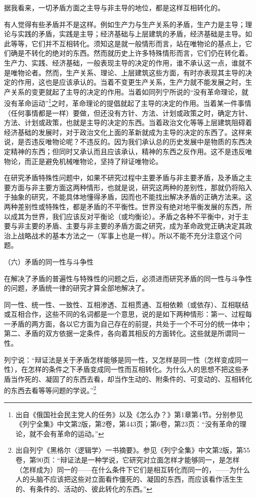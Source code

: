 \documentclass[UTF8, 12pt, a4paper]{ctexrep}
\begin{document}
据我看来，一切矛盾方面之主导与非主导的地位，都是这样互相转化的。

有人觉得有些矛盾并不是这样。例如生产力与生产关系的矛盾，生产力是主导；理论与实践的矛盾，实践是主导；经济基础与上层建筑的矛盾，经济基础是主导。如此等等，它们并不互相转化。须知这是就一般情形而言，站在唯物论的基点上，它们确是不转化的绝对的东西。然而就历史上许多特殊情形而言，它们仍在转化着。生产力、实践、经济基础，一般表现主导的决定的作用，谁不承认这一点，谁就不是唯物论者。然而，生产关系、理论、上层建筑这些方面，有时亦表现其主导的决定的作用，这也是应该承认的。当着不变更生产关系，生产力就不能发展之时，生产关系的变更就起了主导的决定的作用。当着如同列宁所说的“没有革命理论，就没有革命运动”\footnote{出自《俄国社会民主党人的任务》以及《怎么办？》第1章第4节。分别参见《列宁全集》中文第2版，第2卷，第443页；第6卷，第23页：“没有革命的理论，就不会有革命的运动。”}之时，革命理论的提倡就起了主导的决定的作用。当着某一件事情（任何事情都是一样）要做，但还没有方针、方法、计划或政策之时，确定方针、方法、计划或政策，也就是主导的决定的东西。当着政治文化等等上层建筑阻碍着经济基础的发展时，对于政治文化上面的革新就成为主导的决定的东西了。这样来说，是否违反唯物论呢？不违反的。因为我们承认总的历史发展中是物质的东西决定精神的东西；但同时又承认而且应该承认，精神的东西之反作用。这不是违反唯物论，而正是避免机械唯物论，坚持了辩证唯物论。

在研究矛盾特殊性问题中，如果不研究过程中主要矛盾与非主要矛盾，及矛盾之主要方面与非主要方面这两种情形，也就是说，研究这两种的差别性，那就仍将陷入于抽象的研究，不能具体地懂得矛盾，因而也不能找出解决矛盾的正确方法来。这两种差别性或特殊性，都是矛盾的不平衡性。世界没有绝对地平衡发展的东西，所以成其为世界，我们应该反对平衡论（或均衡论）。矛盾之各种不平衡中，对于主要与非主要的矛盾、主要与非主要的矛盾方面之研究，成为革命政党正确决定其政治上战略战术的基本方法之一（军事上也是一样）。所以不能不充分注意这个问题。

（六）矛盾的同一性与斗争性

在解决了矛盾的普遍性与特殊性的问题之后，必须进而研究矛盾的同一性与斗争性的问题，矛盾统一律的研究才算全部地解决了。

同一性、统一性、一致性、互相渗透、互相贯通、互相依赖（或依存）、互相联结或互相合作，这些不同的名词都是一个意思，说的是如下两种情形：第一、过程每一矛盾的两方面，各以它方面为自己存在的前提，共处于一个不可分的统一体中；第二、矛盾的双方依据一定条件，各向着其相反的方面转化。这些就是所谓同一性。

列宁说：“辩证法是关于矛盾怎样能够是同一性，又怎样是同一性（怎样变成同一性），在怎样的条件之下矛盾变成同一性而互相转化。为什么人的思想不把这些矛盾当作死的、凝固了的东西去看，却当作生动的、附条件的、可变动的、互相转化的东西去看等等问题的学说。”\footnote{出自列宁《黑格尔〈逻辑学〉一书摘要》。参见《列宁全集》中文第2版，第55卷，第90页：“辩证法是一种学说，它研究对立面怎样才能够同一，是怎样（怎样成为）同一的——在什么条件下它们是相互转化而同一的，——为什么人的头脑不应该把这些对立面看作僵死的、凝固的东西，而应该看作活生生的、有条件的、活动的、彼此转化的东西。”}
\end{document}
